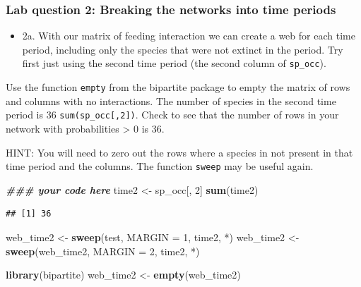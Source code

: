 \documentclass[
]{article}
\newenvironment{Shaded}{\begin{snugshade}}{\end{snugshade}}
\newcommand{\AttributeTok}[1]{\textcolor[rgb]{0.13,0.29,0.53}{#1}}
\newcommand{\DecValTok}[1]{\textcolor[rgb]{0.00,0.00,0.81}{#1}}
\newcommand{\DocumentationTok}[1]{\textcolor[rgb]{0.56,0.35,0.01}{\textbf{\textit{#1}}}}
\newcommand{\FunctionTok}[1]{\textcolor[rgb]{0.13,0.29,0.53}{\textbf{#1}}}
\newcommand{\NormalTok}[1]{#1}
\newcommand{\OtherTok}[1]{\textcolor[rgb]{0.56,0.35,0.01}{#1}}
\newcommand{\StringTok}[1]{\textcolor[rgb]{0.31,0.60,0.02}{#1}}
\providecommand{\tightlist}{%
  \setlength{\itemsep}{0pt}\setlength{\parskip}{0pt}}
\begin{document}
\subsubsection{Lab question 2: Breaking the networks into time
periods}\label{lab-question-2-breaking-the-networks-into-time-periods}

\begin{itemize}
\tightlist
\item
  2a. With our matrix of feeding interaction we can create a web for
  each time period, including only the species that were not extinct in
  the period. Try first just using the second time period (the second
  column of \texttt{sp\_occ}).
\end{itemize}

Use the function \texttt{empty} from the bipartite package to empty the
matrix of rows and columns with no interactions. The number of species
in the second time period is 36 \texttt{sum(sp\_occ{[},2{]})}. Check to
see that the number of rows in your network with probabilities
\textgreater{} 0 is 36.

HINT: You will need to zero out the rows where a species in not present
in that time period and the columns. The function \texttt{sweep} may be
useful again.

\begin{Shaded}
\begin{Highlighting}[]
\DocumentationTok{\#\#\#  your code here}
\NormalTok{time2 }\OtherTok{\textless{}{-}}\NormalTok{ sp\_occ[, }\DecValTok{2}\NormalTok{]}
\FunctionTok{sum}\NormalTok{(time2)}
\end{Highlighting}
\end{Shaded}

\begin{verbatim}
## [1] 36
\end{verbatim}

\begin{Shaded}
\begin{Highlighting}[]
\NormalTok{web\_time2 }\OtherTok{\textless{}{-}} \FunctionTok{sweep}\NormalTok{(test, }\AttributeTok{MARGIN =} \DecValTok{1}\NormalTok{, time2, }\StringTok{\textasciigrave{}}\AttributeTok{*}\StringTok{\textasciigrave{}}\NormalTok{)}
\NormalTok{web\_time2 }\OtherTok{\textless{}{-}} \FunctionTok{sweep}\NormalTok{(web\_time2, }\AttributeTok{MARGIN =} \DecValTok{2}\NormalTok{, time2, }\StringTok{\textasciigrave{}}\AttributeTok{*}\StringTok{\textasciigrave{}}\NormalTok{)}

\FunctionTok{library}\NormalTok{(bipartite)}
\NormalTok{web\_time2 }\OtherTok{\textless{}{-}} \FunctionTok{empty}\NormalTok{(web\_time2)}
\end{Highlighting}
\end{Shaded}
\end{document}
